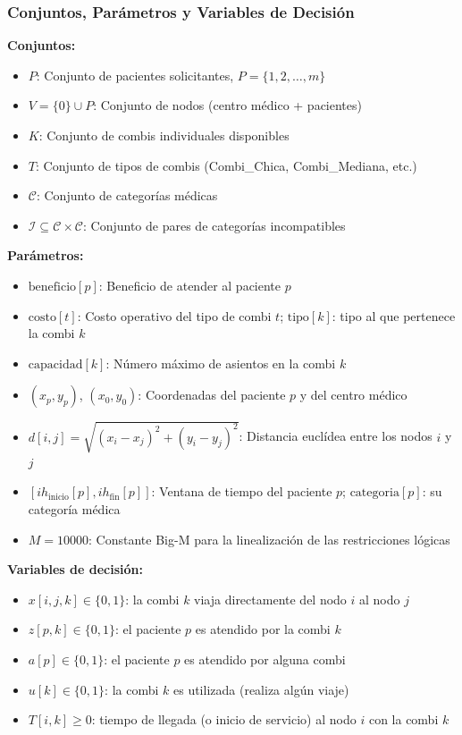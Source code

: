 \documentclass[12pt]{article}
\numberwithin{algorithm}{section}
\begin{document}
\subsubsection{Conjuntos, Parámetros y Variables de Decisión}

\textbf{Conjuntos:}
\begin{itemize}
    \item $P$: Conjunto de pacientes solicitantes, $P = \{1, 2, \ldots, m\}$
    \item $V = \{0\} \cup P$: Conjunto de nodos (centro médico + pacientes)
    \item $K$: Conjunto de combis individuales disponibles
    \item $T$: Conjunto de tipos de combis (Combi\_Chica, Combi\_Mediana, etc.)
    \item $\mathcal{C}$: Conjunto de categorías médicas
    \item $\mathcal{I} \subseteq \mathcal{C} \times \mathcal{C}$: Conjunto de pares de categorías incompatibles
\end{itemize}

\textbf{Parámetros:}
\begin{itemize}
    \item $\text{beneficio}[p]$: Beneficio de atender al paciente $p$
    \item $\text{costo}[t]$: Costo operativo del tipo de combi $t$; $\text{tipo}[k]$: tipo al que pertenece la combi $k$
    \item $\text{capacidad}[k]$: Número máximo de asientos en la combi $k$
    \item $(x_p, y_p)$, $(x_0, y_0)$: Coordenadas del paciente $p$ y del centro médico
    \item $d[i,j] = \sqrt{(x_i - x_j)^2 + (y_i - y_j)^2}$: Distancia euclídea entre los nodos $i$ y $j$
    \item $[ih_{\text{inicio}}[p], ih_{\text{fin}}[p]]$: Ventana de tiempo del paciente $p$; $\text{categoria}[p]$: su categoría médica
    \item $M = 10000$: Constante Big-M para la linealización de las restricciones lógicas
\end{itemize}

\textbf{Variables de decisión:}
\begin{itemize}
    \item $x[i,j,k] \in \{0, 1\}$: la combi $k$ viaja directamente del nodo $i$ al nodo $j$
    \item $z[p,k] \in \{0, 1\}$: el paciente $p$ es atendido por la combi $k$
    \item $a[p] \in \{0, 1\}$: el paciente $p$ es atendido por alguna combi
    \item $u[k] \in \{0, 1\}$: la combi $k$ es utilizada (realiza algún viaje)
    \item $T[i,k] \geq 0$: tiempo de llegada (o inicio de servicio) al nodo $i$ con la combi $k$
\end{itemize}
\end{document}
